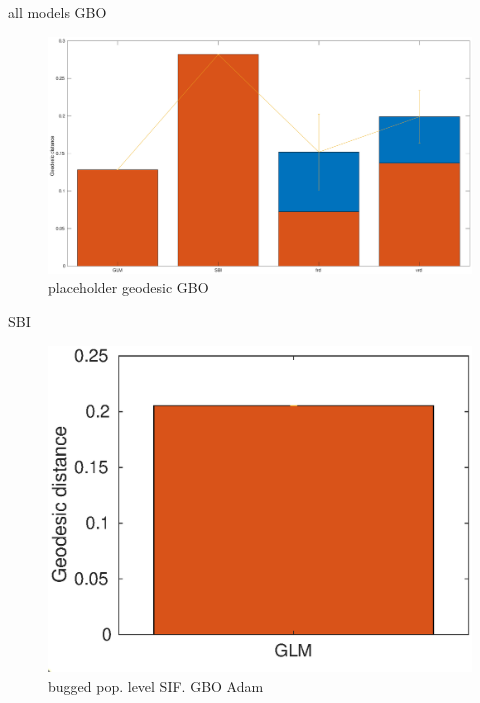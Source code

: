 \documentclass[mphil,deptreport,ianc]{infthesis} %
\begin{document}
all models GBO

\begin{figure}
    \centering
    \includegraphics[width=0.9\columnwidth]{figures/matlab/geodesic_distances_Synthetic_GLIF.eps}
    \caption{placeholder geodesic GBO}
    \label{fig:geodesic_distances}
\end{figure}

SBI

\begin{figure}
    \centering
    \includegraphics[width=0.9\columnwidth]{figures/matlab/bugged_mesoGIF_4.eps}
    \caption{bugged pop. level SIF. GBO Adam}
\end{figure}


\end{document}
